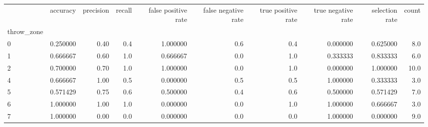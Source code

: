 \begin{tabular}{lrrrrrrrrr}
\toprule
{} &  accuracy &  precision &  recall &  false positive rate &  false negative rate &  true positive rate &  true negative rate &  selection rate &  count \\
throw\_zone &           &            &         &                      &                      &                     &                     &                 &        \\
\midrule
0          &  0.250000 &       0.40 &     0.4 &             1.000000 &                  0.6 &                 0.4 &            0.000000 &        0.625000 &    8.0 \\
1          &  0.666667 &       0.60 &     1.0 &             0.666667 &                  0.0 &                 1.0 &            0.333333 &        0.833333 &    6.0 \\
2          &  0.700000 &       0.70 &     1.0 &             1.000000 &                  0.0 &                 1.0 &            0.000000 &        1.000000 &   10.0 \\
4          &  0.666667 &       1.00 &     0.5 &             0.000000 &                  0.5 &                 0.5 &            1.000000 &        0.333333 &    3.0 \\
5          &  0.571429 &       0.75 &     0.6 &             0.500000 &                  0.4 &                 0.6 &            0.500000 &        0.571429 &    7.0 \\
6          &  1.000000 &       1.00 &     1.0 &             0.000000 &                  0.0 &                 1.0 &            1.000000 &        0.666667 &    3.0 \\
7          &  1.000000 &       0.00 &     0.0 &             0.000000 &                  0.0 &                 0.0 &            1.000000 &        0.000000 &    9.0 \\
\bottomrule
\end{tabular}
